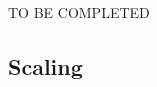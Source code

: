 \documentclass[../main.tex]{subfiles}
\begin{document}
TO BE COMPLETED

\subsection{Scaling}
\end{document}
